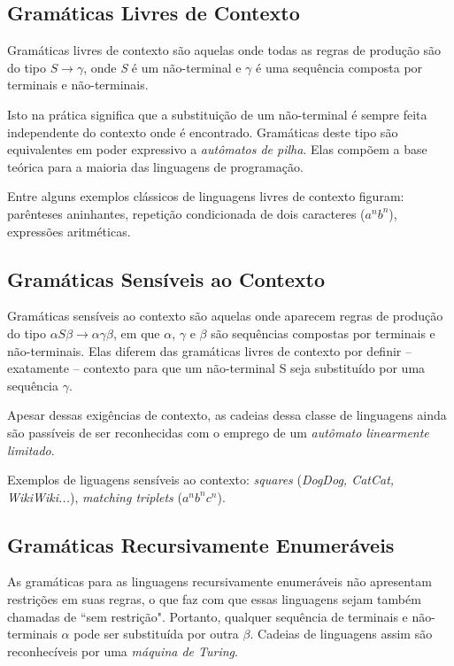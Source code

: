 \documentclass[a4paper,12pt,oneside,onecolumn]{uerj}
\begin{document}
\subsection{Gramáticas Livres de Contexto}

Gramáticas livres de contexto são aquelas onde todas as regras de produção são do tipo $S \rightarrow \gamma$, onde \emph{S} é um não-terminal e $\gamma$ é uma sequência composta por terminais e não-terminais. 

Isto na prática significa que a substituição de um não-terminal é sempre feita independente do contexto onde é encontrado. Gramáticas deste tipo são equivalentes em poder expressivo a \emph{autômatos de pilha}. Elas compõem a base teórica para a maioria das linguagens de programação. 

Entre alguns exemplos clássicos de linguagens livres de contexto figuram: parênteses aninhantes, repetição condicionada de dois caracteres ($a^nb^n$), expressões aritméticas.

\subsection{Gramáticas Sensíveis ao Contexto}
Gramáticas sensíveis ao contexto são aquelas onde aparecem regras de produção do tipo $\alpha S\beta\rightarrow \alpha\gamma\beta$, em que $\alpha$, $\gamma$ e $\beta$ são sequências compostas por terminais e não-terminais. Elas diferem das gramáticas livres de contexto por definir -- exatamente -- contexto para que um não-terminal S seja substituído por uma sequência $\gamma$. 

Apesar dessas exigências de contexto, as cadeias dessa classe de linguagens ainda são passíveis de ser reconhecidas com o emprego de um \emph{autômato linearmente limitado}. 

Exemplos de liguagens sensíveis ao contexto: \emph{squares} (\emph{DogDog, CatCat, WikiWiki...}), \emph{matching triplets} ($a^nb^nc^n$).

\subsection{Gramáticas Recursivamente Enumeráveis}

As gramáticas para as linguagens recursivamente enumeráveis não apresentam restrições em suas regras, o que faz com que essas linguagens sejam também chamadas de ``sem restrição". Portanto, qualquer sequência de terminais e não-terminais $\alpha$ pode ser substituída por outra $\beta$. Cadeias de linguagens assim são reconhecíveis por uma \emph{máquina de Turing}. 
\end{document}
